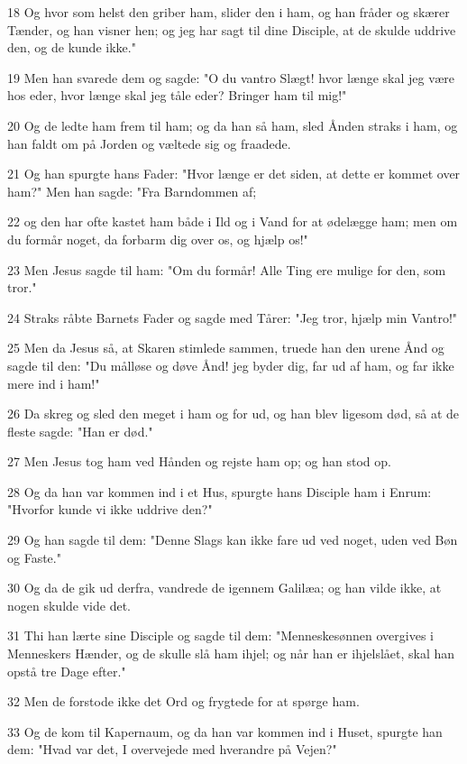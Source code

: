 \par 18 Og hvor som helst den griber ham, slider den i ham, og han fråder og skærer Tænder, og han visner hen; og jeg har sagt til dine Disciple, at de skulde uddrive den, og de kunde ikke."
\par 19 Men han svarede dem og sagde: "O du vantro Slægt! hvor længe skal jeg være hos eder, hvor længe skal jeg tåle eder? Bringer ham til mig!"
\par 20 Og de ledte ham frem til ham; og da han så ham, sled Ånden straks i ham, og han faldt om på Jorden og væltede sig og fraadede.
\par 21 Og han spurgte hans Fader: "Hvor længe er det siden, at dette er kommet over ham?" Men han sagde: "Fra Barndommen af;
\par 22 og den har ofte kastet ham både i Ild og i Vand for at ødelægge ham; men om du formår noget, da forbarm dig over os, og hjælp os!"
\par 23 Men Jesus sagde til ham: "Om du formår! Alle Ting ere mulige for den, som tror."
\par 24 Straks råbte Barnets Fader og sagde med Tårer: "Jeg tror, hjælp min Vantro!"
\par 25 Men da Jesus så, at Skaren stimlede sammen, truede han den urene Ånd og sagde til den: "Du målløse og døve Ånd! jeg byder dig, far ud af ham, og far ikke mere ind i ham!"
\par 26 Da skreg og sled den meget i ham og for ud, og han blev ligesom død, så at de fleste sagde: "Han er død."
\par 27 Men Jesus tog ham ved Hånden og rejste ham op; og han stod op.
\par 28 Og da han var kommen ind i et Hus, spurgte hans Disciple ham i Enrum: "Hvorfor kunde vi ikke uddrive den?"
\par 29 Og han sagde til dem: "Denne Slags kan ikke fare ud ved noget, uden ved Bøn og Faste."
\par 30 Og da de gik ud derfra, vandrede de igennem Galilæa; og han vilde ikke, at nogen skulde vide det.
\par 31 Thi han lærte sine Disciple og sagde til dem: "Menneskesønnen overgives i Menneskers Hænder, og de skulle slå ham ihjel; og når han er ihjelslået, skal han opstå tre Dage efter."
\par 32 Men de forstode ikke det Ord og frygtede for at spørge ham.
\par 33 Og de kom til Kapernaum, og da han var kommen ind i Huset, spurgte han dem: "Hvad var det, I overvejede med hverandre på Vejen?"
